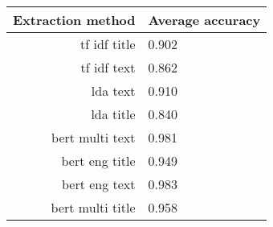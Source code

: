 \begin{tabular}{|r|l|}
  \hline
  Extraction method & Average accuracy \\ 
  \hline
  tf idf title & 0.902 \\ 
  \hline
  tf idf text & 0.862 \\ 
  \hline
  lda text & 0.910 \\ 
  \hline
  lda title & 0.840 \\ 
  \hline
  bert multi text & 0.981 \\ 
  \hline
  bert eng title & 0.949 \\ 
  \hline
  bert eng text & 0.983 \\ 
  \hline
  bert multi title & 0.958 \\ 
  \hline
\end{tabular}
